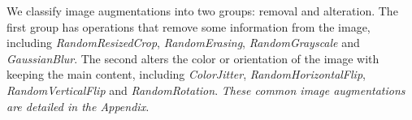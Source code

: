 \documentclass[letterpaper]{article} %
\begin{document}
We classify image augmentations into two groups: removal and alteration. 
The first group has operations that remove some information from the image, including \emph{RandomResizedCrop}, \emph{RandomErasing}, \emph{RandomGrayscale} and \emph{GaussianBlur}.
The second alters the color or orientation of the image with keeping the main content, including \emph{ColorJitter}, \emph{RandomHorizontalFlip}, \emph{RandomVerticalFlip} and \emph{RandomRotation}.
\emph{These common image augmentations are detailed in the Appendix.}


\end{document}
